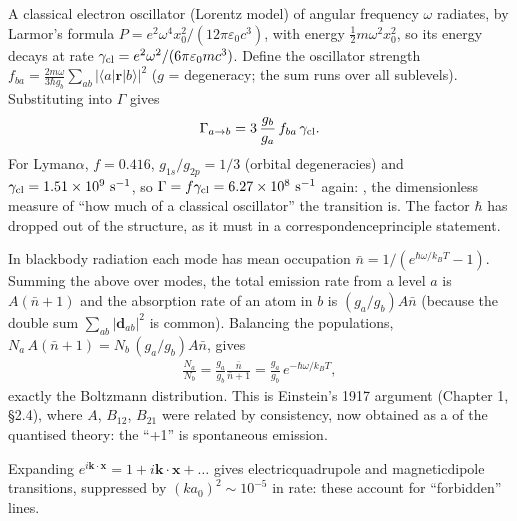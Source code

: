 \documentclass[letterpaper,10pt,english]{jupyterBook}
\begin{document}
\sphinxAtStartPar
{} A classical electron oscillator (Lorentz model) of angular frequency \(\omega\) radiates, by Larmor’s formula \(P=e^2\omega^4x_0^2/(12\pi\varepsilon_0c^3)\), with energy \(\tfrac12m\omega^2x_0^2\), so its energy decays at rate \(\gamma_{\rm cl}=e^2\omega^2/(6\pi\varepsilon_0mc^3)\). Define the oscillator strength \(f_{ba}=\frac{2m\omega}{3\hbar g_b}\sum_{ab}|\langle a|\mathbf r|b\rangle|^2\) (\(g\) = degeneracy; the sum runs over all sublevels). Substituting into \(\Gamma\) gives
\begin{equation*}
\begin{split}
\Gamma_{a\to b}=3\,\frac{g_b}{g_a}\,f_{ba}\,\gamma_{\rm cl}.
\end{split}
\end{equation*}
\sphinxAtStartPar
For Lyman\sphinxhyphen{}\(\alpha\), \(f=0.416\), \(g_{1s}/g_{2p}=1/3\) (orbital degeneracies) and \(\gamma_{\rm cl}=1.51\times10^{9}\ \text{s}^{-1}\), so \(\Gamma=f\gamma_{\rm cl}=6.27\times10^8\ \text{s}^{-1}\) again: , the dimensionless measure of “how much of a classical oscillator” the transition is. The factor \(\hbar\) has dropped out of the structure, as it must in a correspondence\sphinxhyphen{}principle statement.

\sphinxAtStartPar
{} In blackbody radiation each mode has mean occupation \(\bar n=1/(e^{\hbar\omega/k_BT}-1)\). Summing the above over modes, the total emission rate from a level \(a\) is \(A(\bar n+1)\) and the absorption rate of an atom in \(b\) is \((g_a/g_b)A\bar n\) (because the double sum \(\sum_{ab}|\mathbf d_{ab}|^2\) is common). Balancing the populations, \(N_a\,A(\bar n+1)=N_b\,(g_a/g_b)A\bar n\), gives
\begin{equation*}
\begin{split}
\frac{N_a}{N_b}=\frac{g_a}{g_b}\frac{\bar n}{\bar n+1}=\frac{g_a}{g_b}\,e^{-\hbar\omega/k_BT},
\end{split}
\end{equation*}
\sphinxAtStartPar
exactly the Boltzmann distribution. This is Einstein’s 1917 argument (Chapter 1, §2.4), where \(A\), \(B_{12}\), \(B_{21}\) were related by consistency, now obtained as a  of the quantised theory: the “+1” is spontaneous emission.

\sphinxAtStartPar
{} Expanding \(e^{i\mathbf k\cdot\mathbf x}=1+i\mathbf k\!\cdot\!\mathbf x+\dots\) gives electric\sphinxhyphen{}quadrupole and magnetic\sphinxhyphen{}dipole transitions, suppressed by \((ka_0)^2\sim10^{-5}\) in rate: these account for “forbidden” lines.
\end{document}
